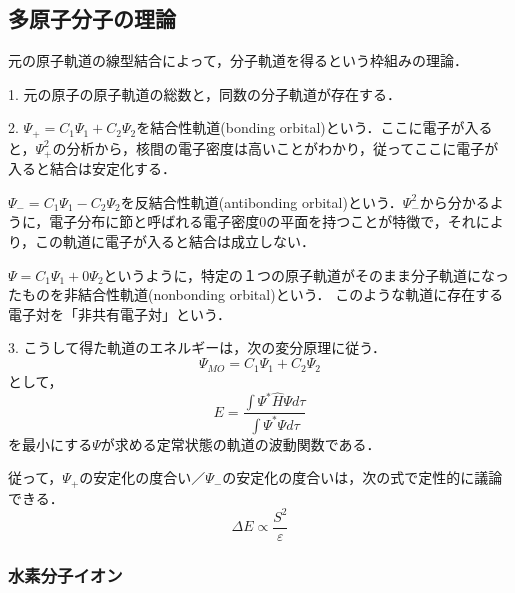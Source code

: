 \documentclass[uplatex, dvipdfmx]{jsreport}
\begin{document}
\subsection{多原子分子の理論}


\begin{theory}
    元の原子軌道の線型結合によって，分子軌道を得るという枠組みの理論．

    1. 元の原子の原子軌道の総数と，同数の分子軌道が存在する．

    2. $\Psi_+ = C_1\Psi_1 + C_2\Psi_2$を結合性軌道(bonding orbital)という．ここに電子が入ると，$\Psi_+^2$の分析から，核間の電子密度は高いことがわかり，従ってここに電子が入ると結合は安定化する．

    $\Psi_- = C_1\Psi_1 - C_2\Psi_2$を反結合性軌道(antibonding orbital)という．$\Psi_-^2$から分かるように，電子分布に節と呼ばれる電子密度$0$の平面を持つことが特徴で，それにより，この軌道に電子が入ると結合は成立しない．

    $\Psi = C_1\Psi_1 + 0\Psi_2$というように，特定の１つの原子軌道がそのまま分子軌道になったものを非結合性軌道(nonbonding orbital)という．
    このような軌道に存在する電子対を「非共有電子対」という．

    3. こうして得た軌道のエネルギーは，次の変分原理に従う．
    \[ \Psi_{MO} = C_1\Psi_1 + C_2\Psi_2 \]
    として，
    \[ E = \frac{\int\Psi^*\hat{H}\Psi d\tau}{\int \Psi^*\Psi d\tau}  \]
    を最小にする$\Psi$が求める定常状態の軌道の波動関数である．

    従って，$\Psi_+$の安定化の度合い／$\Psi_-$の安定化の度合いは，次の式で定性的に議論できる．
    \[ \Delta E\propto \frac{S^2}{\varepsilon} \]
    \rightline{$\blacksquare$}
\end{theory}

\subsubsection{水素分子イオン}
\end{document}
